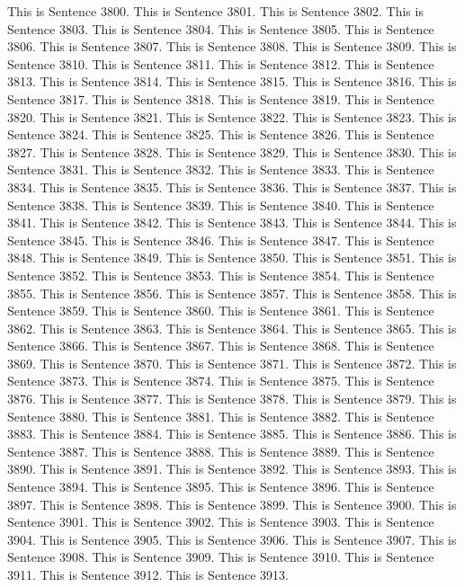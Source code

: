 \documentclass{article}
\begin{document}
This is Sentence 3800.
This is Sentence 3801.
This is Sentence 3802.
This is Sentence 3803.
This is Sentence 3804.
This is Sentence 3805.
This is Sentence 3806.
This is Sentence 3807.
This is Sentence 3808.
This is Sentence 3809.
This is Sentence 3810.
This is Sentence 3811.
This is Sentence 3812.
This is Sentence 3813.
This is Sentence 3814.
This is Sentence 3815.
This is Sentence 3816.
This is Sentence 3817.
This is Sentence 3818.
This is Sentence 3819.
This is Sentence 3820.
This is Sentence 3821.
This is Sentence 3822.
This is Sentence 3823.
This is Sentence 3824.
This is Sentence 3825.
This is Sentence 3826.
This is Sentence 3827.
This is Sentence 3828.
This is Sentence 3829.
This is Sentence 3830.
This is Sentence 3831.
This is Sentence 3832.
This is Sentence 3833.
This is Sentence 3834.
This is Sentence 3835.
This is Sentence 3836.
This is Sentence 3837.
This is Sentence 3838.
This is Sentence 3839.
This is Sentence 3840.
This is Sentence 3841.
This is Sentence 3842.
This is Sentence 3843.
This is Sentence 3844.
This is Sentence 3845.
This is Sentence 3846.
This is Sentence 3847.
This is Sentence 3848.
This is Sentence 3849.
This is Sentence 3850.
This is Sentence 3851.
This is Sentence 3852.
This is Sentence 3853.
This is Sentence 3854.
This is Sentence 3855.
This is Sentence 3856.
This is Sentence 3857.
This is Sentence 3858.
This is Sentence 3859.
This is Sentence 3860.
This is Sentence 3861.
This is Sentence 3862.
This is Sentence 3863.
This is Sentence 3864.
This is Sentence 3865.
This is Sentence 3866.
This is Sentence 3867.
This is Sentence 3868.
This is Sentence 3869.
This is Sentence 3870.
This is Sentence 3871.
This is Sentence 3872.
This is Sentence 3873.
This is Sentence 3874.
This is Sentence 3875.
This is Sentence 3876.
This is Sentence 3877.
This is Sentence 3878.
This is Sentence 3879.
This is Sentence 3880.
This is Sentence 3881.
This is Sentence 3882.
This is Sentence 3883.
This is Sentence 3884.
This is Sentence 3885.
This is Sentence 3886.
This is Sentence 3887.
This is Sentence 3888.
This is Sentence 3889.
This is Sentence 3890.
This is Sentence 3891.
This is Sentence 3892.
This is Sentence 3893.
This is Sentence 3894.
This is Sentence 3895.
This is Sentence 3896.
This is Sentence 3897.
This is Sentence 3898.
This is Sentence 3899.
This is Sentence 3900.
This is Sentence 3901.
This is Sentence 3902.
This is Sentence 3903.
This is Sentence 3904.
This is Sentence 3905.
This is Sentence 3906.
This is Sentence 3907.
This is Sentence 3908.
This is Sentence 3909.
This is Sentence 3910.
This is Sentence 3911.
This is Sentence 3912.
This is Sentence 3913.
\end{document}
